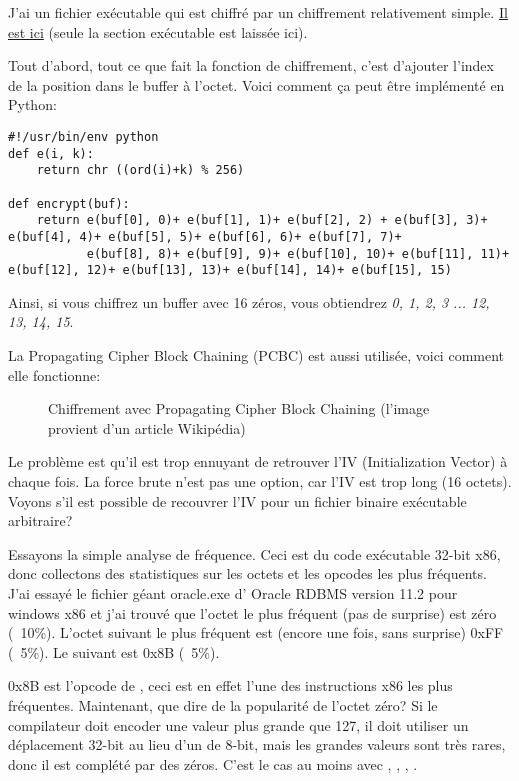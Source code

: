 
J'ai un fichier exécutable qui est chiffré par un chiffrement relativement simple.
\href{\GitHubBlobMasterURL/examples/simple_exec_crypto/files/cipher.bin}{Il est ici}
(seule la section exécutable est laissée ici).

Tout d'abord, tout ce que fait la fonction de chiffrement, c'est d'ajouter l'index
de la position dans le buffer à l'octet.
Voici comment ça peut être implémenté en Python:

\begin{lstlisting}[caption=Python script,style=custompy]
#!/usr/bin/env python
def e(i, k):
    return chr ((ord(i)+k) % 256)

def encrypt(buf):
    return e(buf[0], 0)+ e(buf[1], 1)+ e(buf[2], 2) + e(buf[3], 3)+ e(buf[4], 4)+ e(buf[5], 5)+ e(buf[6], 6)+ e(buf[7], 7)+
           e(buf[8], 8)+ e(buf[9], 9)+ e(buf[10], 10)+ e(buf[11], 11)+ e(buf[12], 12)+ e(buf[13], 13)+ e(buf[14], 14)+ e(buf[15], 15)
\end{lstlisting}

Ainsi, si vous chiffrez un buffer avec 16 zéros, vous obtiendrez \emph{0, 1, 2, 3 ... 12, 13, 14, 15}.

La Propagating Cipher Block Chaining (PCBC) est aussi utilisée, voici comment elle
fonctionne:

\begin{figure}[H]
\centering
{}
\caption{Chiffrement avec Propagating Cipher Block Chaining (l'image provient d'un article Wikipédia)}
\end{figure}

Le problème est qu'il est trop ennuyant de retrouver l'IV (Initialization Vector)
à chaque fois.
La force brute n'est pas une option, car l'IV est trop long (16 octets).
Voyons s'il est possible de recouvrer l'IV pour un fichier binaire exécutable arbitraire?

Essayons la simple analyse de fréquence.
Ceci est du code exécutable 32-bit x86, donc collectons des statistiques sur les
octets et les opcodes les plus fréquents.
J'ai essayé le fichier géant oracle.exe d' Oracle RDBMS version 11.2 pour windows
x86 et j'ai trouvé que l'octet le plus fréquent (pas de surprise) est zéro (~10\%).
L'octet suivant le plus fréquent est (encore une fois, sans surprise) 0xFF (~5\%).
Le suivant est 0x8B (~5\%).

0x8B est l'opcode de , ceci est en effet l'une des instructions x86 les
plus fréquentes.
Maintenant, que dire de la popularité de l'octet zéro?
Si le compilateur doit encoder une valeur plus grande que 127, il doit utiliser un
déplacement 32-bit au lieu d'un de 8-bit, mais les grandes valeurs sont très rares,
donc il est complété par des zéros.
C'est le cas au moins avec , , , .

